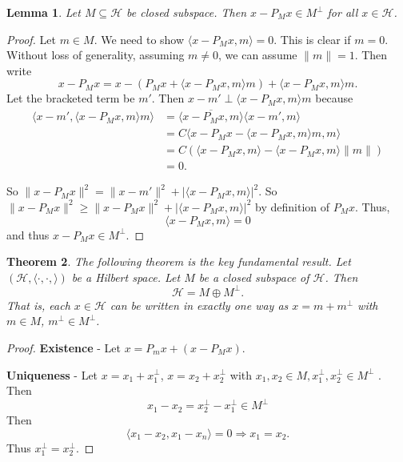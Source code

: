 \documentclass[10pt, reqno, oneside]{amsart}
\theoremstyle{plain}%
\newtheorem{thm}{Theorem}[section]
\newtheorem{lem}[thm]{Lemma}
\theoremstyle{definition}
\theoremstyle{remark}
\renewcommand{\H}{\mathcal{H}}
\newcommand{\hilb}{(\H, \langle \cdot, \cdot, \rangle )}
\begin{document}
\begin{lem}
	Let $M \subseteq \H$ be closed subspace.  Then $x - P_M x \in M^{\perp}$ for all $x \in \H$.
\end{lem}

\begin{proof}
	Let $m \in M$.  We need to show $\langle x - P_M x , m \rangle = 0$.  This is clear if $m = 0$.  Without loss of generality, assuming $ m \neq 0$, we can assume $ \| m \| = 1$.  Then write \[
		x - P_M x = x - \left( P_M x + \langle x - P_M x, m \rangle m \right) + \langle x - P_M x, m \rangle m.
	\]   Let the bracketed term be $m'$.  Then $ x- m' \perp \langle x - P_M x, m \rangle m$ because 
	\begin{align*}
		\langle x - m', \langle x - P_M x, m \rangle m \rangle &= \overline{\langle x - P_M x, m \rangle} \langle x - m', m \rangle \\
		&= C \langle x - P_M x - \langle x - P_M x, m \rangle m, m \rangle \\
		&= C( \langle x - P_M x, m \rangle - \langle x - P_M x, m \rangle \| m \|) \\
		&= 0.
	\end{align*}
	
	So $\| x - P_M x \|^2 = \| x - m' \|^2 + | \langle x - P_M x, m \rangle |^2$.  So $\| x - P_M x \|^2 \geq \| x - P_M x\|^2 + | \langle x - P_M x, m \rangle |^2$ by definition of $P_M x$.  Thus, \[
		\langle x - P_M x, m \rangle = 0 
	\] and thus $x - P_M x \in M^\perp$.
\end{proof}

\begin{thm}
	The following theorem is the key fundamental result.  
	Let $\hilb$ be a Hilbert space.  Let $M$ be a closed subspace of $\H$.  Then \[
		 \H = M \oplus M^\perp.
	\]  That is, each $x \in \H$ can be written in exactly one way as $x = m + m^\perp$ with $m \in M$, $m^\perp \in M^\perp$. 
\end{thm}

\begin{proof}
	\textbf{Existence} - Let $x = P_m x + ( x - P_M x)$. 
	
	\textbf{Uniqueness} - Let $x = x_1 + x_1^\perp$, $x = x_2 + x_2^\perp$ with $x_1, x_2 \in M, x_1^\perp, x_2^\perp \in M^\perp$
.  Then \[
	x_1 -x_2 = x^\perp_2 - x_1^\perp \in M^\perp
\] Then \[
	\langle x_1 - x_2, x_1 - x_n \rangle = 0 \Rightarrow x_1 = x_2 .  
\] Thus $x_1^\perp = x_2^\perp$.
\end{proof} 
\end{document}
